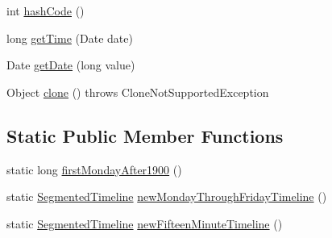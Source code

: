 \begin{DoxyCompactItemize}
\item 
int \mbox{\hyperlink{classorg_1_1jfree_1_1chart_1_1axis_1_1_segmented_timeline_a9bb3d3b220198016d512adc4398b53d8}{hash\+Code}} ()
\item 
long \mbox{\hyperlink{classorg_1_1jfree_1_1chart_1_1axis_1_1_segmented_timeline_aae736ac013f08ce15b1c7b4b001b297d}{get\+Time}} (Date date)
\item 
Date \mbox{\hyperlink{classorg_1_1jfree_1_1chart_1_1axis_1_1_segmented_timeline_a5cc0568fbb47b7584d6f21fb8424fdc1}{get\+Date}} (long value)
\item 
Object \mbox{\hyperlink{classorg_1_1jfree_1_1chart_1_1axis_1_1_segmented_timeline_ae65d1e1c8a1bb47827154b1702772ff5}{clone}} ()  throws Clone\+Not\+Supported\+Exception 
\end{DoxyCompactItemize}
\subsection*{Static Public Member Functions}
\begin{DoxyCompactItemize}
\item 
static long \mbox{\hyperlink{classorg_1_1jfree_1_1chart_1_1axis_1_1_segmented_timeline_ab3383e4a942db7477039a9d0cc586555}{first\+Monday\+After1900}} ()
\item 
static \mbox{\hyperlink{classorg_1_1jfree_1_1chart_1_1axis_1_1_segmented_timeline}{Segmented\+Timeline}} \mbox{\hyperlink{classorg_1_1jfree_1_1chart_1_1axis_1_1_segmented_timeline_a298842f4c7afa5dc9d3737304ce9ebc2}{new\+Monday\+Through\+Friday\+Timeline}} ()
\item 
static \mbox{\hyperlink{classorg_1_1jfree_1_1chart_1_1axis_1_1_segmented_timeline}{Segmented\+Timeline}} \mbox{\hyperlink{classorg_1_1jfree_1_1chart_1_1axis_1_1_segmented_timeline_a5547c304db2d82d577d46c4fa916ae99}{new\+Fifteen\+Minute\+Timeline}} ()
\end{DoxyCompactItemize}
